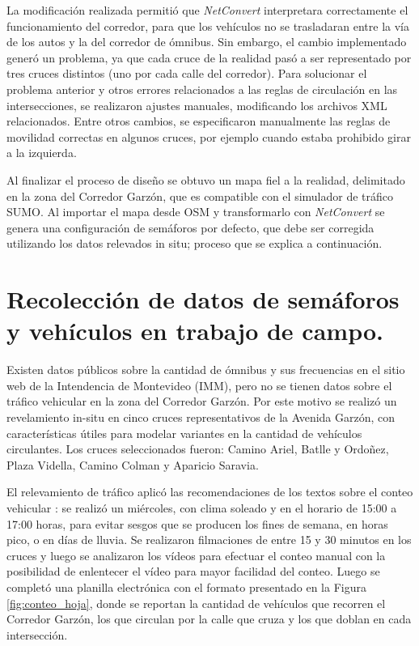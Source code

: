 La modificación realizada permitió que \emph{NetConvert} interpretara correctamente el funcionamiento del corredor, para que los vehículos no se trasladaran entre la vía de los autos y la del corredor de ómnibus. Sin embargo, el cambio implementado generó un problema, ya que cada cruce de la realidad pasó a ser representado por tres cruces distintos (uno por cada calle del corredor). Para solucionar el problema anterior y otros errores relacionados a las reglas de circulación en las intersecciones, se realizaron ajustes manuales, modificando los archivos XML relacionados. Entre otros cambios, se especificaron manualmente las reglas de movilidad correctas en algunos cruces, por ejemplo cuando estaba prohibido girar a la izquierda.

Al finalizar el proceso de diseño se obtuvo un mapa fiel a la realidad, delimitado en la zona del Corredor Garzón, que es compatible con el simulador de tráfico SUMO. Al importar el mapa desde OSM y transformarlo con \emph{NetConvert} se genera una configuración de semáforos por defecto, que debe ser corregida utilizando los datos relevados in situ; proceso que se explica a continuación.


\section{Recolección de datos de semáforos y vehículos en trabajo de campo.}

Existen datos públicos sobre la cantidad de ómnibus y sus frecuencias en el sitio web de la Intendencia de Montevideo (IMM), pero no se tienen datos sobre el tráfico vehicular en la zona del Corredor Garzón. Por este motivo se realizó un revelamiento in-situ en cinco cruces representativos de la Avenida Garzón, con características útiles para modelar variantes en la cantidad de vehículos circulantes. 
Los cruces seleccionados fueron: Camino Ariel, Batlle y Ordoñez, Plaza Vidella, Camino Colman y Aparicio Saravia. 

El relevamiento de tráfico aplicó las recomendaciones de los textos sobre el conteo vehicular \citep{ConteoTrafico}: se realizó un miércoles, con clima soleado y en el horario de 15:00 a 17:00 horas, para evitar sesgos que se producen los fines de semana, en horas pico, o en días de lluvia. Se realizaron filmaciones de entre 15 y 30 minutos en los cruces y luego se analizaron los vídeos para efectuar el conteo manual con la posibilidad de enlentecer el vídeo para mayor facilidad del conteo. Luego se completó una planilla electrónica con el formato presentado en la Figura \ref{fig:conteo_hoja}, donde se reportan la cantidad de vehículos que recorren el Corredor Garzón, los que circulan por la calle que cruza y los que doblan en cada intersección. 

